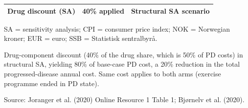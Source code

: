 \begin{table}[H]
{\begin{threeparttable}
\begin{tabular}[t]{>{\raggedright\arraybackslash}p{6.2cm}>{\raggedleft\arraybackslash}p{3.1cm}>{\raggedright\arraybackslash}p{5.4cm}}
\textcolor[HTML]{2D3748}{Drug discount (SA)} & \textcolor[HTML]{2D3748}{40\% applied} & \textcolor[HTML]{2D3748}{Structural SA scenario}\\
\bottomrule
\end{tabular}
\begin{tablenotes}
\item SA = sensitivity analysis; CPI = consumer price index; NOK = Norwegian kroner; EUR = euro; SSB = Statistisk sentralbyrå.
\item Drug-component discount (40\% of the drug share, which is 50\% of PD costs) in structural SA, yielding 80\% of base-case PD cost, a 20\% reduction in the total progressed-disease annual cost. Same cost applies to both arms (exercise programme ended in PD state).
\item Source: Joranger et al. (2020) Online Resource 1 Table 1; Bjørnelv et al. (2020).
\end{tablenotes}
\end{threeparttable}
}
\end{table}
